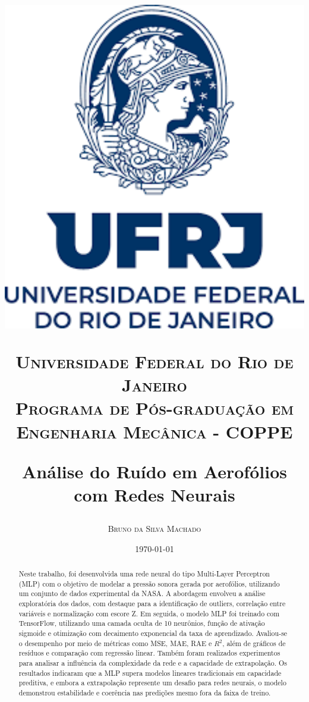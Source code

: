 \documentclass[12pt,a4paper,oneside]{report}
\title{\vspace{-5mm}\fontsize{18pt}{10pt}
	\vspace*{-100pt}
	\begin{center}
		\begin{minipage}{0.20\textwidth}
			\centering \includegraphics[width=1.2\textwidth]{img/ufrj-logo.png}
		\end{minipage}
	\end{center}
	\normalfont\textsc{Universidade Federal do 
		Rio de Janeiro \\ 
		Programa de Pós-graduação em Engenharia Mecânica - COPPE}\\
	\vspace*{100pt}
	
	\bf{Análise do Ruído em Aerofólios com Redes Neurais}
	\vspace*{30pt}
}
\author{
	\large 
	\textsc{Bruno da Silva Machado}
}
\date{\today}
\begin{document}
	
	\maketitle
	
	\setcounter{page}{1}
	
	\begin{abstract}
	Neste trabalho, foi desenvolvida uma rede neural do tipo Multi-Layer Perceptron (MLP) com o objetivo de modelar a pressão sonora gerada por aerofólios, utilizando um conjunto de dados experimental da NASA. A abordagem envolveu a análise exploratória dos dados, com destaque para a identificação de outliers, correlação entre variáveis e normalização com escore Z. Em seguida, o modelo MLP foi treinado com TensorFlow, utilizando uma camada oculta de 10 neurônios, função de ativação sigmoide e otimização com decaimento exponencial da taxa de aprendizado. Avaliou-se o desempenho por meio de métricas como MSE, MAE, RAE e $R^2$, além de gráficos de resíduos e comparação com regressão linear. Também foram realizados experimentos para analisar a influência da complexidade da rede e a capacidade de extrapolação. 
	Os resultados indicaram que a MLP supera modelos lineares tradicionais em capacidade preditiva, e embora a extrapolação represente um desafio para redes neurais, o modelo demonstrou estabilidade e coerência nas predições mesmo fora da faixa de treino.
		
		
	\end{abstract}
	
	\listoffigures
	
	
	\listoftables
	
	\lstlistoflistings
	
\end{document}
